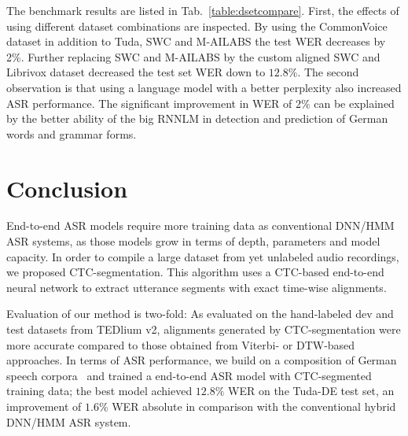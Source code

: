 \documentclass[runningheads]{llncs}
\begin{document}
The benchmark results are listed in Tab.~\ref{table:dsetcompare}.
First, the effects of using different dataset combinations are inspected.
By using the CommonVoice dataset in addition to Tuda, SWC and M-AILABS the test WER decreases by 2\%.
Further replacing SWC and M-AILABS by the custom aligned SWC and Librivox dataset decreased the test set WER down to $12.8\%$.
The second observation is that using a language model with a better perplexity also increased ASR performance.
The significant improvement in WER of $2\%$ can be explained by the better ability of the big RNNLM in detection and prediction of German words and grammar forms.




\section{Conclusion}

End-to-end ASR models require more training data as conventional DNN/HMM ASR systems, as those models grow in terms of depth, parameters and model capacity.
In order to compile a large dataset from yet unlabeled audio recordings, we proposed CTC-segmentation.
This algorithm uses a CTC-based end-to-end neural network to extract utterance segments with exact time-wise alignments.

Evaluation of our method is two-fold:
As evaluated on the hand-labeled dev and test datasets from TEDlium v2, alignments generated by CTC-segmentation were more accurate compared to those obtained from Viterbi- or DTW-based approaches.
In terms of ASR performance, we build on a composition of German speech corpora~\cite{Milde2018} and trained a end-to-end ASR model with CTC-segmented training data;
the best model achieved $12.8\%$ WER on the Tuda-DE test set, an improvement of $1.6\%$ WER absolute in comparison with the conventional hybrid DNN/HMM ASR system.

















\end{document}
